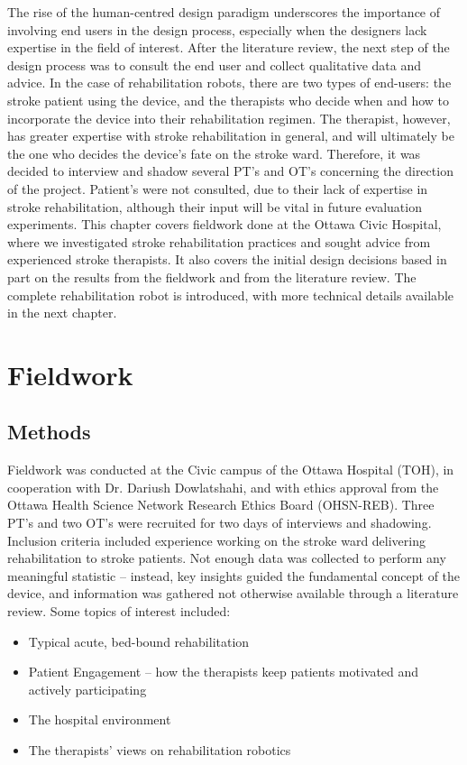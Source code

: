 \documentclass[12pt]{report}
\begin{document}
	The rise of the human-centred design paradigm underscores the importance of involving end users in the design process, especially when the designers lack expertise in the field of interest. After the literature review, the next step of the design process was to consult the end user and collect qualitative data and advice. In the case of rehabilitation robots, there are two types of end-users: the stroke patient using the device, and the therapists who decide when and how to incorporate the device into their rehabilitation regimen. The therapist, however, has greater expertise with stroke rehabilitation in general, and will ultimately be the one who decides the device's fate on the stroke ward. Therefore, it was decided to interview and shadow several PT's and OT's concerning the direction of the project. Patient's were not consulted, due to their lack of expertise in stroke rehabilitation, although their input will be vital in future evaluation experiments.  This chapter covers fieldwork done at the Ottawa Civic Hospital, where we investigated stroke rehabilitation practices and sought advice from experienced stroke therapists. It also covers the initial design decisions based in part on the results from the fieldwork and from the literature review. The complete rehabilitation robot is introduced, with more technical details available in the next chapter.

\section{Fieldwork} 

\subsection{Methods}

	Fieldwork was conducted at the Civic campus of the Ottawa Hospital (TOH), in cooperation with Dr. Dariush Dowlatshahi, and with ethics approval from the Ottawa Health Science Network Research Ethics Board (OHSN-REB). Three PT's and two OT's were recruited for two days of interviews and shadowing. Inclusion criteria included experience working on the stroke ward delivering rehabilitation to stroke patients. Not enough data was collected to perform any meaningful statistic -- instead, key insights guided the fundamental concept of the device, and information was gathered not otherwise available through a literature review. Some topics of interest included:
	
	\begin{itemize}
		\item Typical acute, bed-bound rehabilitation 
		\item Patient Engagement -- how the therapists keep patients motivated and actively participating 
		\item The hospital environment
		\item The therapists' views on rehabilitation robotics 
	\end{itemize}
\end{document}

